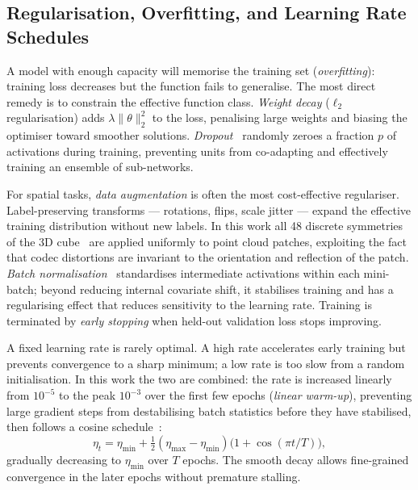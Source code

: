 \subsection{Regularisation, Overfitting, and Learning Rate Schedules}

A model with enough capacity will memorise the training set
(\emph{overfitting}): training loss decreases but the function fails to
generalise.
The most direct remedy is to constrain the effective function class.
\emph{Weight decay} ($\ell_2$ regularisation) adds $\lambda\|\theta\|_2^2$
to the loss, penalising large weights and biasing the optimiser toward smoother
solutions.
\emph{Dropout}~\cite{srivastava2014dropout} randomly zeroes a fraction $p$
of activations during training, preventing units from co-adapting and
effectively training an ensemble of sub-networks.

For spatial tasks, \emph{data augmentation} is often the most
cost-effective regulariser.
Label-preserving transforms --- rotations, flips, scale jitter --- expand
the effective training distribution without new labels.
In this work all 48 discrete symmetries of the 3D
cube~\cite{winkels2018gcnn,cohen2016equivariant} are applied uniformly to
point cloud patches, exploiting the fact that codec distortions are
invariant to the orientation and reflection of the patch.
\emph{Batch normalisation}~\cite{ioffe2015batch} standardises intermediate
activations within each mini-batch; beyond reducing internal covariate shift,
it stabilises training and has a regularising effect that reduces sensitivity
to the learning rate.
Training is terminated by \emph{early stopping} when held-out validation
loss stops improving.

A fixed learning rate is rarely optimal.
A high rate accelerates early training but prevents convergence to a sharp
minimum; a low rate is too slow from a random initialisation.
In this work the two are combined: the rate is increased linearly from
$10^{-5}$ to the peak $10^{-3}$ over the first few epochs (\emph{linear
warm-up}), preventing large gradient steps from destabilising batch statistics
before they have stabilised, then follows a cosine
schedule~\cite{loshchilov2017sgdr}:
\begin{equation}
  \eta_t = \eta_{\min} + \tfrac{1}{2}(\eta_{\max} - \eta_{\min})
           \bigl(1 + \cos(\pi t / T)\bigr),
\end{equation}
gradually decreasing to $\eta_{\min}$ over $T$ epochs.
The smooth decay allows fine-grained convergence in the later epochs without
premature stalling.



